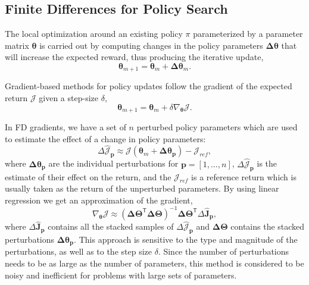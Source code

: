 \documentclass{aamas2016}
\newcommand{\transpose}{\text{$\mathsf{T}$}}
\begin{document}
\subsection{Finite Differences for Policy Search}
The local optimization around an existing policy $\pi$ parameterized by a parameter matrix $\boldsymbol{\theta}$ 
is carried out by computing changes in the policy parameters $\boldsymbol{\Delta \theta}$ that will increase the expected reward, thus
producing the iterative update,
\begin{displaymath}
 \boldsymbol{\theta}_{m+1} = \boldsymbol{\theta}_{m}+\boldsymbol{\Delta \theta}_{m}.
\end{displaymath}


Gradient-based methods for policy updates follow the gradient of the expected return $\mathcal{J}$ %
given a step-size $\delta$,
\begin{displaymath}
 \boldsymbol{\theta}_{m+1} = \boldsymbol{\theta}_{m}+\delta\nabla_{\boldsymbol{\theta}}\mathcal{J}.
\end{displaymath}

In FD gradients, we have a set of $n$ perturbed policy parameters which are used to estimate the effect of a change in policy parameters:
\begin{displaymath}
 \Delta\hat{\mathcal{J}}_{\mathbf{p}} \approx \mathcal{J}(\boldsymbol{\theta}_{m}+\boldsymbol{\Delta\theta_{p}}) - \mathcal{J}_{ref},
\end{displaymath}
where $\boldsymbol{\Delta\theta_{p}}$ are the individual perturbations for $\mathbf{p}=[1,\ldots,n]$, $\Delta\hat{\mathcal{J}}_{\mathbf{p}}$ is the estimate of their 
effect on the return, and the $\mathcal{J}_{ref}$ is a reference return which is usually taken as the return of the unperturbed
parameters. By using linear regression we get an approximation of the gradient,
\begin{displaymath}
 \nabla_{\boldsymbol{\theta}}\mathcal{J} \approx \left(\boldsymbol{\Delta\Theta^{\transpose}\Delta\Theta}\right)^{-1}\boldsymbol{\Delta\Theta}^{\transpose}\Delta\boldsymbol{\hat{J}_{p}},
\end{displaymath}
where $\Delta\boldsymbol{\hat{J}_{p}}$ contains all the stacked samples of $\Delta\hat{\mathcal{J}}_{\mathbf{p}}$ and  $\boldsymbol{\Delta\Theta}$
contains the stacked perturbations $\boldsymbol{\Delta\theta_{p}}$. This approach is sensitive to the type and magnitude of the perturbations, as well as
to the step size $\delta$. Since the number of perturbations needs to be as large as the number of parameters, this method is
considered to be noisy and inefficient for problems with large sets of parameters.%
\end{document}
